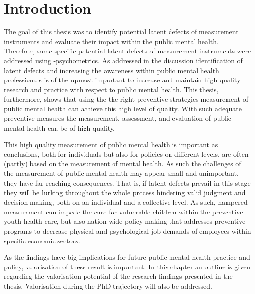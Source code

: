 \section*{Introduction}
The goal of this thesis was to identify potential latent defects of measurement instruments and evaluate their impact within the public mental health. 
Therefore, some specific potential latent defects of measurement instruments were addressed using \textbeta-psychometrics. 
As addressed in the discussion identification of latent defects and increasing the awareness within public mental health professionals is of the upmost important to increase and maintain high quality research and practice with respect to public mental health. 
This thesis, furthermore, shows that using the the right preventive strategies measurement of public mental health can achieve this high level of quality. 
With such adequate preventive measures the measurement, assessment, and evaluation of public mental health can be of high quality.

This high quality measurement of public mental health is important as conclusions, both for individuals but also for policies on different levels, are often (partly) based on the measurement of mental health. 
As such the challenges of the measurement of public mental health may appear small and unimportant, they have far-reaching consequences. 
That is, if latent defects prevail in this stage they will be lurking throughout the whole process hindering valid judgment and decision making, both on an individual and a collective level. 
As such, hampered measurement can impede the care for vulnerable children within the preventive youth health care, but also nation-wide policy making that addresses preventive programs to decrease physical and psychological job demands of employees within specific economic sectors. 

As the findings have big implications for future public mental health practice and policy, valorisation of these result is important. 
In this chapter an outline is given regarding the valorisation potential of the research findings presented in the thesis. 
Valorisation during the PhD trajectory will also be addressed.

